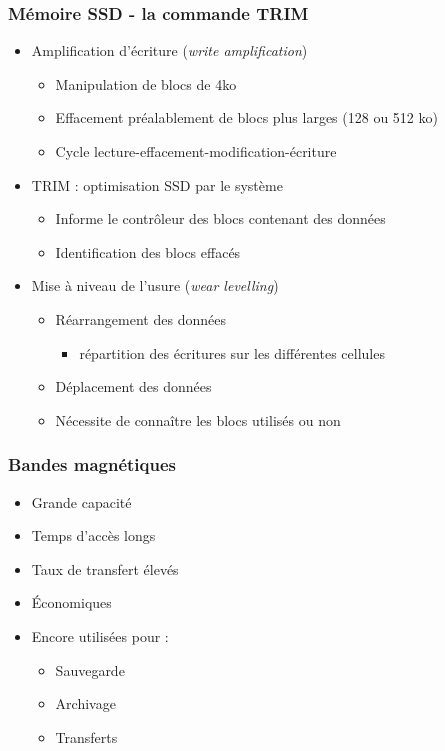 \begin{frame}
\frametitle{Mémoire SSD - la commande TRIM}
\begin{itemize}

\item Amplification d’écriture (\textit{write amplification})
\begin{itemize}
\item Manipulation de blocs de 4ko
\item Effacement préalablement de blocs plus larges (128 ou 512 ko)
\item Cycle lecture-effacement-modification-écriture
\end{itemize}

\item TRIM : optimisation SSD par le système
\begin{itemize}
\item Informe le contrôleur des blocs contenant des données
\item Identification des blocs effacés
\end{itemize}

\item Mise à niveau de l’usure (\textit{wear levelling})
\begin{itemize}
\item Réarrangement des données
\begin{itemize}
\item répartition des écritures sur les différentes cellules
\end{itemize}

\item Déplacement des données
\item Nécessite de connaître les blocs utilisés ou non
\end{itemize}

\end{itemize}

\end{frame}

\begin{frame}
\frametitle{Bandes magnétiques}
\begin{itemize}
\item Grande capacité
\item Temps d’accès longs
\item Taux de transfert élevés
\item Économiques
\item Encore utilisées pour :
\begin{itemize}
\item Sauvegarde
\item Archivage
\item Transferts
\end{itemize}
\end{itemize}
\end{frame}


